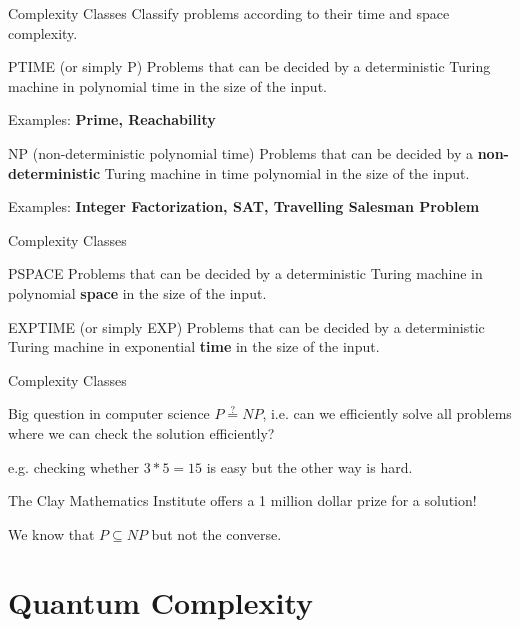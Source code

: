 \documentclass[c]{beamer}
\begin{document}
\begin{frame}{Complexity Classes}
    Classify problems according to their time and space complexity.
	\begin{block}{PTIME (or simply P)}
		Problems that can be decided by a deterministic Turing machine in polynomial time in the size of the input.
    \end{block}
    Examples: \textbf{Prime, Reachability}
    \begin{block}{NP (non-deterministic polynomial time)}
		Problems that can be decided by a \textbf{non-deterministic} Turing machine in time polynomial in the size of the input.
    \end{block}
    Examples: \textbf{Integer Factorization, SAT, Travelling Salesman Problem}
\end{frame}

\begin{frame}{Complexity Classes}
    \begin{block}{PSPACE}
		Problems that can be decided by a deterministic Turing machine in polynomial \textbf{space} in the size of the input.
    \end{block}
    \begin{block}{EXPTIME (or simply EXP)}
		Problems that can be decided by a deterministic Turing machine in exponential \textbf{time} in the size of the input.
    \end{block}
\end{frame}

\begin{frame}{Complexity Classes}
 
 \begin{block}{Big question in computer science}
 	$P\stackrel{?}{=}NP$, i.e. can we efficiently solve all problems where we can check the solution efficiently?
 \end{block}
 e.g. checking whether $3*5 = 15$ is easy but the other way is hard.

 \medskip
 The Clay Mathematics Institute offers a 1 million dollar prize for a solution!
 
 We know that $ P \subseteq NP$ but not the converse. 
\end{frame}

\section{Quantum Complexity}
\end{document}
